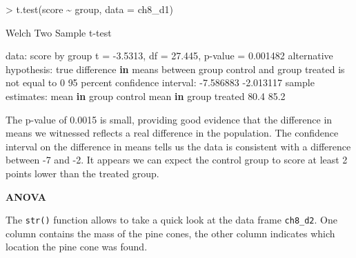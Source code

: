 \documentclass[
]{book}
\newenvironment{Shaded}{\begin{snugshade}}{\end{snugshade}}
\newcommand{\AttributeTok}[1]{\textcolor[rgb]{0.77,0.63,0.00}{#1}}
\newcommand{\ControlFlowTok}[1]{\textcolor[rgb]{0.13,0.29,0.53}{\textbf{#1}}}
\newcommand{\DecValTok}[1]{\textcolor[rgb]{0.00,0.00,0.81}{#1}}
\newcommand{\ErrorTok}[1]{\textcolor[rgb]{0.64,0.00,0.00}{\textbf{#1}}}
\newcommand{\FloatTok}[1]{\textcolor[rgb]{0.00,0.00,0.81}{#1}}
\newcommand{\FunctionTok}[1]{\textcolor[rgb]{0.00,0.00,0.00}{#1}}
\newcommand{\NormalTok}[1]{#1}
\newcommand{\OtherTok}[1]{\textcolor[rgb]{0.56,0.35,0.01}{#1}}
\newcommand{\SpecialCharTok}[1]{\textcolor[rgb]{0.00,0.00,0.00}{#1}}
\newcommand{\StringTok}[1]{\textcolor[rgb]{0.31,0.60,0.02}{#1}}
\begin{document}
\begin{Shaded}
\begin{Highlighting}[]
\SpecialCharTok{\textgreater{}} \FunctionTok{t.test}\NormalTok{(score }\SpecialCharTok{\textasciitilde{}}\NormalTok{ group, }\AttributeTok{data =}\NormalTok{ ch8\_d1)}

\NormalTok{    Welch Two Sample t}\SpecialCharTok{{-}}\NormalTok{test}

\NormalTok{data}\SpecialCharTok{:}\NormalTok{  score by group}
\NormalTok{t }\OtherTok{=} \SpecialCharTok{{-}}\FloatTok{3.5313}\NormalTok{, df }\OtherTok{=} \FloatTok{27.445}\NormalTok{, p}\SpecialCharTok{{-}}\NormalTok{value }\OtherTok{=} \FloatTok{0.001482}
\NormalTok{alternative hypothesis}\SpecialCharTok{:}\NormalTok{ true difference }\ControlFlowTok{in}\NormalTok{ means between group control and group treated is not equal to }\DecValTok{0}
\DecValTok{95}\NormalTok{ percent confidence interval}\SpecialCharTok{:}
 \SpecialCharTok{{-}}\FloatTok{7.586883} \SpecialCharTok{{-}}\FloatTok{2.013117}
\NormalTok{sample estimates}\SpecialCharTok{:}
\NormalTok{mean }\ControlFlowTok{in}\NormalTok{ group control mean }\ControlFlowTok{in}\NormalTok{ group treated }
                 \FloatTok{80.4}                  \FloatTok{85.2} 
\end{Highlighting}
\end{Shaded}

The p-value of 0.0015 is small, providing good evidence that the difference in means we witnessed reflects a real difference in the population. The confidence interval on the difference in means tells us the data is consistent with a difference between -7 and -2. It appears we can expect the control group to score at least 2 points lower than the treated group.

\textbf{ANOVA}

The \texttt{str()} function allows to take a quick look at the data frame \texttt{ch8\_d2}. One column contains the mass of the pine cones, the other column indicates which location the pine cone was found.

\begin{Shaded}
\end{Shaded}
\end{document}

